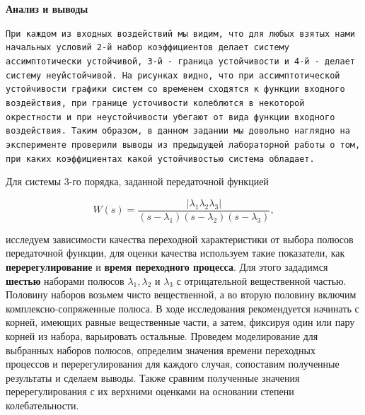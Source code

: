 \begin{par}
\begin{flushleft}
\textbf{Анализ и выводы}
\end{flushleft}
\end{par}

\begin{par}
\begin{flushleft}
\texttt{При каждом из входных воздействий мы видим, что для любых взятых нами начальных условий 2-й набор коэффициентов делает систему ассимптотически устойчивой, 3-й - граница устойчивости и  4-й - делает систему неуйстойчивой. На рисунках видно, что при ассимптотической устойчивости графики систем со временем сходятся к функции входного воздействия, при границе усточивости колеблются в некоторой окрестности и при неустойчивости убегают от вида функции входного воздействия. Таким образом, в данном задании мы довольно наглядно на эксперименте проверили выводы из предыдущей лабораторной работы о том, при каких коэффициентах какой устойчивостью система обладает.}
\end{flushleft}
\end{par}




\begin{par}
\begin{flushleft}
 Для системы 3-го порядка, заданной передаточной функцией
\end{flushleft}
\end{par}

\begin{par}
$$W(s)=\frac{|\lambda_1 \lambda_2 \lambda_3 |}{(s-\lambda_1 )(s-\lambda_2 )(s-\lambda_3 )},$$
\end{par}

\begin{par}
\begin{flushleft}
исследуем зависимости качества переходной характеристики от выбора полюсов передаточной функции, для оценки качества используем такие показатели, как \textbf{перерегулирование} и \textbf{время переходного процесса}. Для этого зададимся \textbf{шестью} наборами полюсов $\lambda_1 ,\lambda_2$ и $\lambda_3$ с отрицательной вещественной частью. Половину наборов возьмем чисто вещественной, а во вторую половину включим комплексно-сопряженные полюса. В ходе исследования рекомендуется начинать с корней, имеющих равные вещественные части, а затем, фиксируя один или пару корней из набора, варьировать остальные. Проведем моделирование для выбранных наборов полюсов, определим значения времени переходных процессов и перерегулирования для каждого случая, сопоставим полученные результаты и сделаем выводы. Также сравним полученные значения перерегулирования с их верхними оценками на основании степени колебательности.
\end{flushleft}
\end{par}


